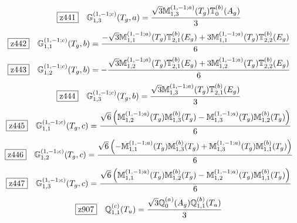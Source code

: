 \documentclass[fleqn,10pt,landscape]{jsarticle}
\begin{document}
\begin{dmath*}
\hspace*{3mm}\fbox{z441}\quad \mathbb{G}_{1,3}^{(1,-1;c)}(T_{g},a)=\frac{\sqrt{3} \mathbb{M}_{1,3}^{(1,-1;a)}(T_{g}) \mathbb{T}_{0}^{(b)}(A_{g})}{3}
\end{dmath*}
\begin{dmath*}
\hspace*{3mm}\fbox{z442}\quad \mathbb{G}_{1,1}^{(1,-1;c)}(T_{g},b)=\frac{- \sqrt{3} \mathbb{M}_{1,1}^{(1,-1;a)}(T_{g}) \mathbb{T}_{2,1}^{(b)}(E_{g}) + 3 \mathbb{M}_{1,1}^{(1,-1;a)}(T_{g}) \mathbb{T}_{2,2}^{(b)}(E_{g})}{6}
\end{dmath*}
\begin{dmath*}
\hspace*{3mm}\fbox{z443}\quad \mathbb{G}_{1,2}^{(1,-1;c)}(T_{g},b)=- \frac{\sqrt{3} \mathbb{M}_{1,2}^{(1,-1;a)}(T_{g}) \mathbb{T}_{2,1}^{(b)}(E_{g}) + 3 \mathbb{M}_{1,2}^{(1,-1;a)}(T_{g}) \mathbb{T}_{2,2}^{(b)}(E_{g})}{6}
\end{dmath*}
\begin{dmath*}
\hspace*{3mm}\fbox{z444}\quad \mathbb{G}_{1,3}^{(1,-1;c)}(T_{g},b)=\frac{\sqrt{3} \mathbb{M}_{1,3}^{(1,-1;a)}(T_{g}) \mathbb{T}_{2,1}^{(b)}(E_{g})}{3}
\end{dmath*}
\begin{dmath*}
\hspace*{3mm}\fbox{z445}\quad \mathbb{G}_{1,1}^{(1,-1;c)}(T_{g},c)=\frac{\sqrt{6} \left(\mathbb{M}_{1,2}^{(1,-1;a)}(T_{g}) \mathbb{M}_{1,3}^{(b)}(T_{g}) - \mathbb{M}_{1,3}^{(1,-1;a)}(T_{g}) \mathbb{M}_{1,2}^{(b)}(T_{g})\right)}{6}
\end{dmath*}
\begin{dmath*}
\hspace*{3mm}\fbox{z446}\quad \mathbb{G}_{1,2}^{(1,-1;c)}(T_{g},c)=\frac{\sqrt{6} \left(- \mathbb{M}_{1,1}^{(1,-1;a)}(T_{g}) \mathbb{M}_{1,3}^{(b)}(T_{g}) + \mathbb{M}_{1,3}^{(1,-1;a)}(T_{g}) \mathbb{M}_{1,1}^{(b)}(T_{g})\right)}{6}
\end{dmath*}
\begin{dmath*}
\hspace*{3mm}\fbox{z447}\quad \mathbb{G}_{1,3}^{(1,-1;c)}(T_{g},c)=\frac{\sqrt{6} \left(\mathbb{M}_{1,1}^{(1,-1;a)}(T_{g}) \mathbb{M}_{1,2}^{(b)}(T_{g}) - \mathbb{M}_{1,2}^{(1,-1;a)}(T_{g}) \mathbb{M}_{1,1}^{(b)}(T_{g})\right)}{6}
\end{dmath*}
\begin{dmath*}
\hspace*{3mm}\fbox{z907}\quad \mathbb{Q}_{1,1}^{(c)}(T_{u})=\frac{\sqrt{3} \mathbb{Q}_{0}^{(a)}(A_{g}) \mathbb{Q}_{1,1}^{(b)}(T_{u})}{3}
\end{dmath*}
\end{document}
